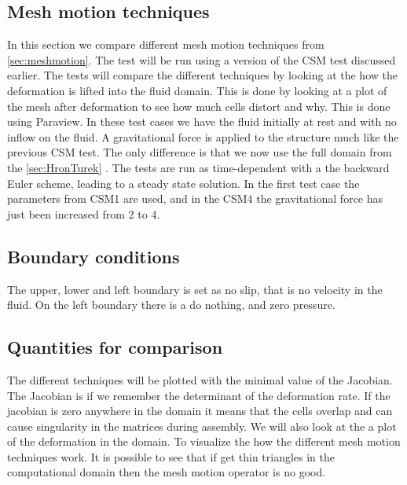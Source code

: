 \subsection{Mesh motion techniques}\label{sec:mesh_motion}
In this section we compare different mesh motion techniques from \ref{sec:meshmotion}. The test will be run using a version of the CSM test discussed earlier. The tests will compare the different techniques by looking at the how the deformation is lifted into the fluid domain. This is done by looking at a plot of the mesh after deformation to see how much cells distort and why. This is done using Paraview.\newline
In these test cases we have the fluid initially at rest and with no inflow on the fluid. A gravitational force is applied to the structure much like the previous CSM test. The only difference is that we now use the full domain from the \ref{sec:HronTurek} . The tests are run as time-dependent with a the backward Euler scheme, leading to a steady state solution. In the first test case the parameters from CSM1 are used, and in the CSM4 the gravitational force has just been increased from 2 to 4. 
\subsection*{Boundary conditions}
The upper, lower and left boundary is set as no slip, that is no velocity in the fluid. On the left boundary there is a do nothing, and zero pressure. 
\subsection*{Quantities for comparison}
The different techniques will be plotted with the minimal value of the Jacobian. The Jacobian is if we remember the determinant of the deformation rate. If the jacobian is zero anywhere in the domain it means that the cells overlap and can cause singularity in the matrices during assembly. \newline
We will also look at the a plot of the deformation in the domain. To visualize the how the different mesh motion techniques work. It is possible to see that if get thin triangles in the computational domain then the mesh motion operator is no good. 

